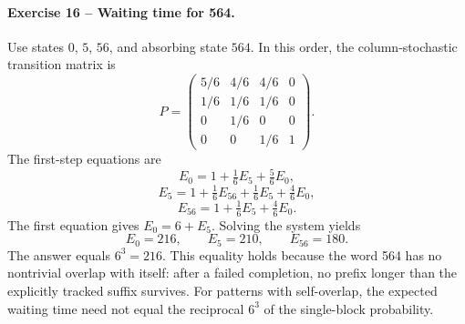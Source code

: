 \documentclass[10pt]{article}
\begin{document}
\paragraph{Exercise 16 -- Waiting time for 564.}

Use states $0$, $5$, $56$, and absorbing state $564$. In this order, the
column-stochastic transition matrix is
\[
P=\begin{pmatrix}
5/6&4/6&4/6&0\\
1/6&1/6&1/6&0\\
0&1/6&0&0\\
0&0&1/6&1
\end{pmatrix}.
\]
The first-step equations are
\[
E_0=1+\tfrac16E_5+\tfrac56E_0,
\]
\[
E_5=1+\tfrac16E_{56}+\tfrac16E_5+\tfrac46E_0,
\]
\[
E_{56}=1+\tfrac16E_5+\tfrac46E_0.
\]
The first equation gives $E_0=6+E_5$. Solving the system yields
\[
\boxed{E_0=216},\qquad E_5=210,\qquad E_{56}=180.
\]
The answer equals $6^3=216$. This equality holds because the word 564 has no
nontrivial overlap with itself: after a failed completion, no prefix longer
than the explicitly tracked suffix survives. For patterns with self-overlap,
the expected waiting time need not equal the reciprocal $6^3$ of the
single-block probability.
\end{document}

